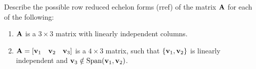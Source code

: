 \begin{problem}{\problemnum}
Describe the possible row reduced echelon forms (rref) of the matrix $\mathbf{A}$ for each of the following:
\begin{enumerate}
    \item $\mathbf{A}$ is a $3 \times 3$ matrix with linearly independent columns.
    \item $\mathbf{A} = [\mathbf{v}_1 \quad \mathbf{v}_2 \quad \mathbf{v}_3]$ is a $4 \times 3$ matrix, such that $\{\mathbf{v}_1, \mathbf{v}_2\}$ is linearly independent and $\mathbf{v}_3 \notin \text{Span}(\mathbf{v}_1,\mathbf{v}_2)$.
\end{enumerate}
\end{problem}
